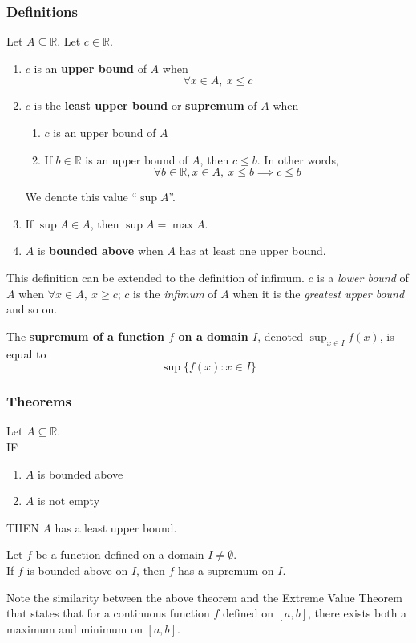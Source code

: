 \documentclass[11pt]{article}
\def\R{{\mathbb R}}
\newenvironment{definition}[1][]{\begin{tcolorbox}[colframe=_orange,colback=_orange2,title=Definition. \ifthenelse{\isempty{#1}}{}{(#1)}
]}{\end{tcolorbox}}
\newenvironment{theorem}[1][]{\begin{tcolorbox}[colframe=_blue,colback=_blue2,title=Theorem. \ifthenelse{\isempty{#1}}{}{(#1)}
]}{\end{tcolorbox}}
\begin{document}
\subsubsection{Definitions}
\begin{definition}
    Let $A\subseteq\R$. Let $c\in\R$.
    \begin{enumerate}
        \item $c$ is an \textbf{upper bound} of $A$ when
              $$\forall x\in A,~x\leq c$$
        \item $c$ is the \textbf{least upper bound} or \textbf{supremum} of $A$ when
              \begin{enumerate}
                  \item $c$ is an upper bound of $A$
                  \item If $b\in\R$ is an upper bound of $A$, then $c\leq b$. In other words,
                        $$
                            \forall b\in\R, x\in A,~x\leq b\implies c\leq b
                        $$
              \end{enumerate}
              We denote this value ``$\sup A$''.
        \item If $\sup A\in A$, then $\sup A=\max A$.
        \item $A$ is \textbf{bounded above} when $A$ has at least one upper bound.
    \end{enumerate}
\end{definition}
This definition can be extended to the definition of infimum. $c$ is a \textit{lower bound} of $A$ when $\forall x\in A,~x\geq c$; $c$ is the \textit{infimum} of $A$ when it is the \textit{greatest upper bound} and so on.
\begin{definition}[Supremum of a Function]
    The \textbf{supremum of a function $f$ on a domain $I$}, denoted {\small$\displaystyle\sup_{x\in I}f(x)$}, is equal to
    $$
        \sup\{f(x):x\in I\}
    $$
\end{definition}
\subsubsection{Theorems}
\begin{theorem}[Lowest Upper Bound Principle]
    Let $A\subseteq\R$. \\
    IF
    \begin{enumerate}
        \item $A$ is bounded above
        \item $A$ is not empty
    \end{enumerate}
    THEN $A$ has a least upper bound.
\end{theorem}
\begin{theorem}
    Let $f$ be a function defined on a domain $I\neq \emptyset$.\\If $f$ is bounded above on $I$, then $f$ has a supremum on $I$.
\end{theorem}
Note the similarity between the above theorem and the Extreme Value Theorem that states that for a continuous function $f$ defined on $[a,b]$, there exists both a maximum and minimum on $[a,b]$.
\end{document}
